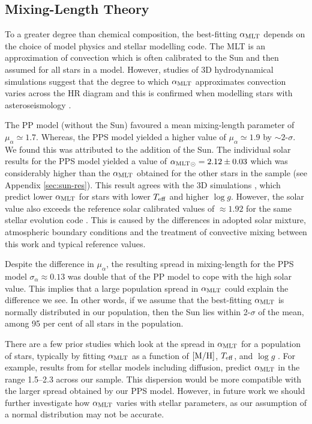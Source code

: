 \subsection{Mixing-Length Theory}\label{sec:mlt}

To a greater degree than chemical composition, the best-fitting ${\alpha_\mathrm{MLT}}$ depends on the choice of model physics and stellar modelling code. The MLT is an approximation of convection which is often calibrated to the Sun and then assumed for all stars in a model. However, studies of 3D hydrodynamical simulations suggest that the degree to which ${\alpha_\mathrm{MLT}}$ approximates convection varies across the HR diagram \citep{Magic.Weiss.ea2015} and this is confirmed when modelling stars with asteroseismology \citep{Tayar.Somers.ea2017}.

The PP model (without the Sun) favoured a mean mixing-length parameter of $\mu_\alpha \simeq 1.7$. Whereas, the PPS model yielded a higher value of $\mu_\alpha \simeq 1.9$ by $\sim 2$-$\sigma$. We found this was attributed to the addition of the Sun. The individual solar results for the PPS model yielded a value of ${\alpha_\mathrm{MLT}}_\odot = 2.12\pm0.03$ which was considerably higher than the ${\alpha_\mathrm{MLT}}$ obtained for the other stars in the sample (see Appendix \ref{sec:sun-res}). This result agrees with the 3D simulations \citep[e.g.][]{Trampedach.Stein.ea2014}, which predict lower ${\alpha_\mathrm{MLT}}$ for stars with lower ${T_\mathrm{eff}}$ and higher $\log g$. However, the solar value also exceeds the reference solar calibrated values of $\approx 1.92$ for the same stellar evolution code \citep{Paxton.Bildsten.ea2011}. This is caused by the differences in adopted solar mixture, atmospheric boundary conditions and the treatment of convective mixing between this work and typical reference values.

Despite the difference in $\mu_\alpha$, the resulting spread in mixing-length for the PPS model $\sigma_\alpha \approx 0.13$ was double that of the PP model to cope with the high solar value. This implies that a large population spread in ${\alpha_\mathrm{MLT}}$ could explain the difference we see. In other words, if we assume that the best-fitting ${\alpha_\mathrm{MLT}}$ is normally distributed in our population, then the Sun lies within 2-$\sigma$ of the mean, among 95 per cent of all stars in the population. 

There are a few prior studies which look at the spread in ${\alpha_\mathrm{MLT}}$ for a population of stars, typically by fitting ${\alpha_\mathrm{MLT}}$ as a function of $[\mathrm{M}/\mathrm{H}]$, ${T_\mathrm{eff}}$, and $\log g$ \citep[e.g.][]{Bonaca.Tanner.ea2012,Viani.Basu.ea2018}. For example, results from \citet{Viani.Basu.ea2018} for stellar models including diffusion, predict ${\alpha_\mathrm{MLT}}$ in the range \numrange{1.5}{2.3} across our sample. This dispersion would be more compatible with the larger spread obtained by our PPS model. However, in future work we should further investigate how ${\alpha_\mathrm{MLT}}$ varies with stellar parameters, as our assumption of a normal distribution may not be accurate.

